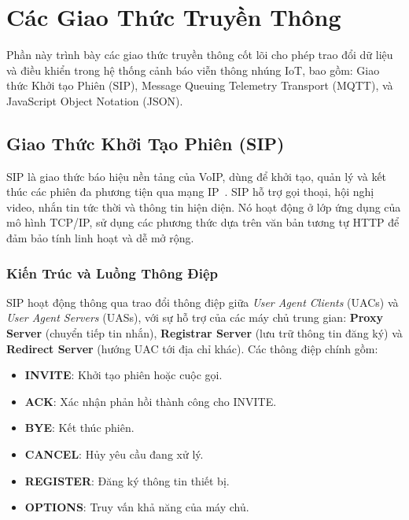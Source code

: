 \section{Các Giao Thức Truyền Thông}
\label{sec:communication_protocols}

Phần này trình bày các giao thức truyền thông cốt lõi cho phép trao đổi dữ liệu và điều khiển trong hệ thống cảnh báo viễn thông nhúng IoT, bao gồm: Giao thức Khởi tạo Phiên (SIP), Message Queuing Telemetry Transport (MQTT), và JavaScript Object Notation (JSON).

\subsection{Giao Thức Khởi Tạo Phiên (SIP)}
\label{subsec:sip_protocol}

SIP là giao thức báo hiệu nền tảng của VoIP, dùng để khởi tạo, quản lý và kết thúc các phiên đa phương tiện qua mạng IP~\cite{sip_rfc3261}. SIP hỗ trợ gọi thoại, hội nghị video, nhắn tin tức thời và thông tin hiện diện. Nó hoạt động ở lớp ứng dụng của mô hình TCP/IP, sử dụng các phương thức dựa trên văn bản tương tự HTTP để đảm bảo tính linh hoạt và dễ mở rộng.

\subsubsection{Kiến Trúc và Luồng Thông Điệp}
\label{subsubsec:sip_architecture}

SIP hoạt động thông qua trao đổi thông điệp giữa \textit{User Agent Clients} (UACs) và \textit{User Agent Servers} (UASs), với sự hỗ trợ của các máy chủ trung gian: \textbf{Proxy Server} (chuyển tiếp tin nhắn), \textbf{Registrar Server} (lưu trữ thông tin đăng ký) và \textbf{Redirect Server} (hướng UAC tới địa chỉ khác). Các thông điệp chính gồm:

\begin{itemize}
\item \textbf{INVITE}: Khởi tạo phiên hoặc cuộc gọi.
\item \textbf{ACK}: Xác nhận phản hồi thành công cho INVITE.
\item \textbf{BYE}: Kết thúc phiên.
\item \textbf{CANCEL}: Hủy yêu cầu đang xử lý.
\item \textbf{REGISTER}: Đăng ký thông tin thiết bị.
\item \textbf{OPTIONS}: Truy vấn khả năng của máy chủ.
\end{itemize}

